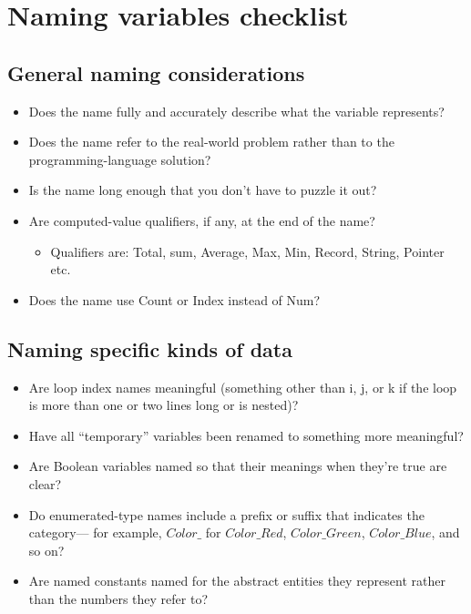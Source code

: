 \newpage
\section{Naming variables checklist}
\subsection{General naming considerations}
\begin{itemize}
\item Does the name fully and accurately describe what the variable represents?
\item Does the name refer to the real-world problem rather than to the programming-language solution?
\item Is the name long enough that you don’t have to puzzle it out?
\item Are computed-value qualifiers, if any, at the end of the name? \begin{itemize}
\item Qualifiers are: Total, sum, Average, Max, Min, Record, String, Pointer etc. 
\end{itemize}
\item Does the name use Count or Index instead of Num?
\end{itemize}

\subsection{Naming specific kinds of data}
\begin{itemize}
\item Are loop index names meaningful (something other than i, j, or k if the loop is more than one or two lines long or is nested)?
\item Have all “temporary” variables been renamed to something more meaningful?
\item Are Boolean variables named so that their meanings when they’re true are clear?
\item Do enumerated-type names include a prefix or suffix that indicates the category— for example, $Color\_ $ for $Color\_Red$, $Color\_Green$, $Color\_Blue$, and so on?
\item Are named constants named for the abstract entities they represent rather than the numbers they refer to?
\end{itemize}

